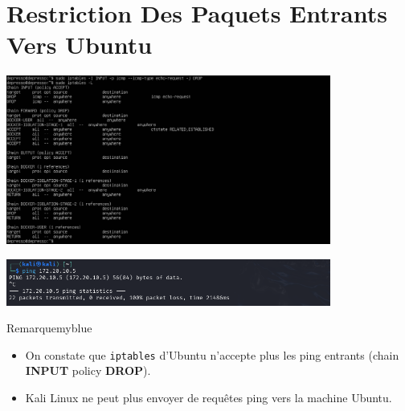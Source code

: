 \section{Restriction Des Paquets Entrants Vers Ubuntu}

\begin{center}
    \includegraphics[width=0.8\textwidth]{Question/SC/ip_1.PNG}
\end{center}

\vspace{0.25cm}

\begin{center}
    \includegraphics[width=0.8\textwidth]{Question/SC/kaliPing.PNG}
\end{center}

\vspace{0.35cm}

\begin{prettyBox}{Remarque}{myblue}
\begin{itemize}
    \item On constate que \texttt{iptables} d’Ubuntu n’accepte plus les ping entrants (chain \textbf{INPUT} policy \textbf{DROP}).
    \item Kali Linux ne peut plus envoyer de requêtes ping vers la machine Ubuntu.
\end{itemize}
\end{prettyBox}

